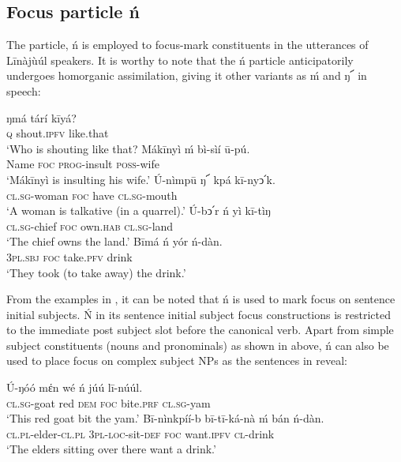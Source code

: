 \documentclass[output=paper,colorlinks,citecolor=brown]{langscibook}
\begin{document}
\subsection{Focus particle ń }\label{sec:bisilki:5.1}

The particle, ń is employed to focus-mark constituents in the utterances of Līnàjùúl speakers. It is worthy to note that the ń particle anticipatorily undergoes homorganic assimilation, giving it other variants as ḿ and ŋ՜ in speech:

\ea%
    \label{ex:bisilki:8}
    \ea\label{ex:bisilki:8a}
        \ea\label{ex:bisilki:8ai}
        \gll    ŋmá	tárí		kīyá?\\
                \textsc{q}	shout\textsc{.ipfv}	like.that\\
        \glt    ‘Who is shouting like that?
        \ex\label{ex:bisilki:8aii}
        \gll    Mákīnyì	ḿ	bì-sìí		ū-pú.\\
                Name		\textsc{foc}	\textsc{prog-}insult	\textsc{poss-}wife\\
        \glt    ‘Mákīnyì is insulting his wife.’
        \z
    \ex\label{ex:bisilki:8b}
    \gll    Ú-nìmpū		ŋ՜	kpá	kī-nyↄ՛k.\\
            \textsc{cl.sg-}woman	\textsc{foc}	have	\textsc{cl.sg-}mouth\\
    \glt    ‘A woman is talkative (in a quarrel).’
    \ex\label{ex:bisilki:8c}
    \gll    Ú-bↄ՛r		ń	yì		kī-tìŋ\\
            \textsc{cl.sg-}chief	\textsc{foc}	own\textsc{.hab}	\textsc{cl.sg-}land\\
    \glt    ‘The chief owns the land.’
    \ex\label{ex:bisilki:8d}
    \gll    Bīmá		ń	yór		ń-dàn.\\
            \textsc{3pl.sbj}	\textsc{foc}	take\textsc{.pfv}	drink\\
    \glt    ‘They took (to take away) the drink.’
    \z
\z

From the examples in , it can be noted that ń is used to mark focus on sentence initial subjects. Ń in its sentence initial subject focus constructions is restricted to the immediate post subject slot before the canonical verb. Apart from simple subject constituents (nouns and pronominals) as shown in  above, ń can also be used to place focus on complex subject NPs as the sentences in  reveal:

\ea%
    \label{ex:bisilki:9}
    \ea\label{ex:bisilki:9a}
    \gll    Ú-ŋóó	mέn		wé	ń	júú		lī-núúl.\\
            \textsc{cl.sg-}goat	red	\textsc{dem}	\textsc{foc}	bite\textsc{.prf}	\textsc{cl.sg-}yam\\
    \glt    ‘This red goat bit the yam.’
    \ex\label{ex:bisilki:9b}
    \gll    Bī-nìnkpíí-b	         bī-tī-ká-nà	    ḿ           bán	 ń-dàn.\\
            \textsc{cl.pl-}elder\textsc{-cl.pl}   \textsc{3pl-loc-}sit\textsc{-def}	   \textsc{foc}	      want\textsc{.ipfv}	 \textsc{cl-}drink\\
    \glt    ‘The elders sitting over there want a drink.’
    \z
\z
\end{document}
